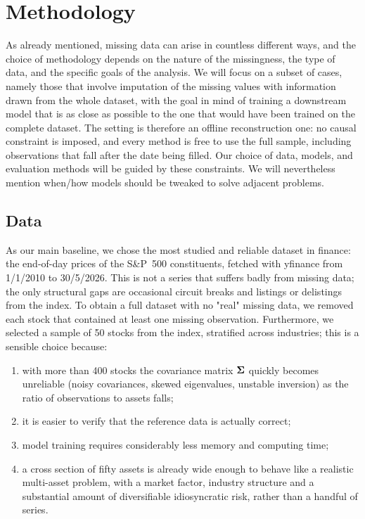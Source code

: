 \chapter{Methodology}
\label{ch:methodology}

As already mentioned, missing data can arise in countless different ways,
and the choice of methodology depends on the nature of the missingness, the type of data,
and the specific goals of the analysis. We will focus on a subset
of cases, namely those that involve imputation of the missing values with
information drawn from the whole dataset, with the goal in mind of training a
downstream model that is as close as possible to the one that would have been
trained on the complete dataset. The setting is therefore an offline
reconstruction one: no causal constraint is imposed, and every method is free
to use the full sample, including observations that fall after the date being
filled.
Our choice of data, models, and evaluation methods will be guided
by these constraints. We will nevertheless mention when/how models should
be tweaked to solve adjacent problems.

\section{Data}
\label{sec:data}

As our main baseline, we chose the most studied and reliable dataset in finance:
the end-of-day prices of the S\&P~500 constituents, fetched with yfinance from
1/1/2010 to 30/5/2026. This is not a series that suffers badly from missing
data; the only structural gaps are occasional circuit breaks and listings or
delistings from the index. To obtain a full dataset with no "real"
missing data, we removed each stock that contained at least one missing observation.
Furthermore, we selected a sample of 50 stocks from the index, stratified across industries;
this is a sensible choice because:
\begin{enumerate}
    \item with more than 400 stocks the covariance matrix $\boldsymbol{\Sigma}$ quickly becomes
    unreliable (noisy covariances, skewed eigenvalues, unstable inversion) as the
    ratio of observations to assets falls;
    \item it is easier to verify that the reference data is actually correct;
    \item model training requires considerably less memory and computing time;
    \item a cross section of fifty assets is already wide enough to behave like a
    realistic multi-asset problem, with a market factor, industry structure and a
    substantial amount of diversifiable idiosyncratic risk, rather than a handful
    of series.
\end{enumerate}

